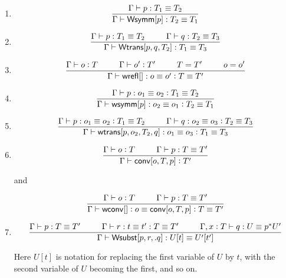 \documentclass[11pt]{article}
\newcommand{\eqd}{\equiv}
\newcommand\spc{{\hskip 26pt}}
\newcommand{\ccolon}{\vcentcolon}
\newcommand{\ccheck}{\vcentcolon}            %
\newcommand{\csynth}{\vcentcolon\vcentcolon} %
\renewcommand{\csynth}{\ccheck}              %
\newcommand{\ha}[2]{#1[#2]}
\newcommand{\Wtrans}{{\sf Wtrans}}
\newcommand{\Wsymm}{{\sf Wsymm}}
\newcommand{\annot}{{\sf annot}}
\newcommand{\haa}[2]{\ha\annot{#1,#2}}
\renewcommand{\haa}[2]{#1}
\newcommand{\conv}{{\sf conv}}
\newcommand{\wconv}{{\sf wconv}}
\newcommand{\Wsubst}{{\sf Wsubst}}
\newcommand{\wrefl}{{\sf wrefl}}
\newcommand{\wsymm}{{\sf wsymm}}
\newcommand{\wtrans}{{\sf wtrans}}
\begin{document}
\begin{enumerate}
\item 
$$\frac{\Gamma \vdash p:T_1\eqd T_2 }{\Gamma \vdash \ha\Wsymm{p}:T_2\eqd T_1}$$

\item 
\[
  \frac{
    \Gamma \vdash p:T_1\eqd T_2
    \spc
    \Gamma \vdash q:T_2\eqd T_3
  }
  {\Gamma \vdash \ha\Wtrans{p,q,T_2}: T_1\eqd T_3 }
\]

\item 
\[\frac{
  \Gamma \vdash o \ccheck{T}
  \spc
  \Gamma \vdash o' \ccheck{T'}
  \spc
  T = T'
  \spc
  o = o'
  } {
  \Gamma \vdash  \ha\wrefl{}: o \eqd o' \ccolon T \eqd T'
  } 
\]

\item 
\[\frac
    {\Gamma \vdash p:o_1\eqd o_2 \ccolon T_1 \eqd T_2}
    {\Gamma \vdash \ha\wsymm{p}:o_2\eqd o_1 \ccolon T_2 \eqd T_1}\]

\item 
\[\frac{\Gamma \vdash p:o_1\eqd o_2 \ccolon T_1 \eqd T_2
  \spc
  \Gamma \vdash q:o_2\eqd o_3 \ccolon T_2 \eqd T_3
  } {
  \Gamma \vdash \ha\wtrans{p,o_2,T_2,q}:o_1\eqd o_3 \ccolon T_1 \eqd T_3}
\]

\item 
\[\frac
    { \Gamma \vdash o \ccolon T \spc \Gamma \vdash p : T \eqd T'}
    { \Gamma \vdash \ha\conv{o,T,p} \ccolon T' }\]

and

\[\frac
    { \Gamma \vdash o \ccolon T \spc
      \Gamma \vdash p : T \eqd T' }
    { \Gamma \vdash \ha\wconv{} \ccolon o \eqd \ha\conv{o,T,p} \ccolon T \eqd T'}\]




\item 
\[ \frac{ 
  \Gamma \vdash p:T \eqd T'  
  \spc
  \Gamma \vdash r:t \eqd t' : T \eqd T'  
  \spc
  \Gamma,  x \ccolon T \vdash q: U \eqd p^*U'
  } {
  \Gamma \vdash \ha\Wsubst{p,r,.q} : U[t] \eqd U'[t']
}\]

Here $U[t]$ is notation for replacing the first variable of $U$ by $t$, with
the second variable of $U$ becoming the first, and so on.  


\end{enumerate}
\end{document}
